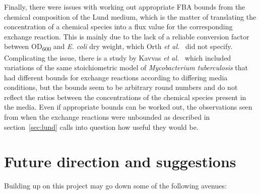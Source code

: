 \documentclass[parskip=full]{scrreprt}
\begin{document}
Finally, there were issues with working out appropriate FBA bounds from the chemical composition of the Lund medium, which is the matter of translating the concentration of a chemical species into a flux value for the corresponding exchange reaction. This is mainly due to the lack of a reliable conversion factor between OD\textsubscript{600} and \emph{E. coli} dry weight, which Orth \emph{et al.}~\cite{orth_comprehensive_2011} did not specify. Complicating the issue, there is a study by Kavvas \emph{et al.}~\cite{kavvas_updated_2018} which included variations of the same stoichiometric model of \emph{Mycobacterium tuberculosis} that had different bounds for exchange reactions according to differing media conditions, but the bounds seem to be arbitrary round numbers and do not reflect the ratios between the concentrations of the chemical species present in the media. Even if appropriate bounds can be worked out, the observations seen from when the exchange reactions were unbounded as described in section~\ref{sec:lund} calls into question how useful they would be.

\section{Future direction and suggestions}
\label{sec:future}

Building up on this project may go down some of the following avenues:
\end{document}
